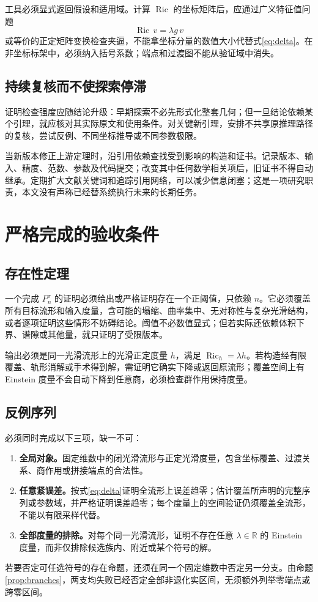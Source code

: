 \documentclass[11pt,a4paper]{article}
\theoremstyle{definition}
\newcommand{\Ric}{\operatorname{Ric}}
\begin{document}
工具必须显式返回假设和适用域。计算 $\Ric$ 的坐标矩阵后，应通过广义特征值问题
\[
\Ric\,v=\lambda g\,v
\]
或等价的正定矩阵变换检查夹逼，不能拿坐标分量的数值大小代替式\eqref{eq:delta}。在非坐标标架中，必须纳入括号系数；端点和过渡图不能从验证域中消失。

\subsection{持续复核而不使探索停滞}

证明检查强度应随结论升级：早期探索不必先形式化整套几何；但一旦结论依赖某个引理，就应核对其实际原文和使用条件。对关键新引理，安排不共享原推理路径的复核，尝试反例、不同坐标推导或不同参数极限。

当新版本修正上游定理时，沿引用依赖查找受到影响的构造和证书。记录版本、输入、精度、范数、参数及代码提交；改变其中任何数学相关项后，旧证书不得自动继承。定期扩大文献关键词和追踪引用网络，可以减少信息闭塞；这是一项研究职责，本文没有声称已经替系统执行未来的长期任务。

\section{严格完成的验收条件}\label{sec:acceptance}

\subsection{存在性定理}

一个完成 $P_n^\sigma$ 的证明必须给出或严格证明存在一个正阈值，只依赖 $n$。它必须覆盖所有目标流形和输入度量，含可能的塌缩、曲率集中、无对称性与复杂光滑结构，或者逐项证明这些情形不妨碍结论。阈值不必数值显式；但若实际还依赖体积下界、谱隙或其他量，就只证明了受限版本。

输出必须是同一光滑流形上的光滑正定度量 $h$，满足 $\Ric_h=\lambda h$。若构造经有限覆盖、轨形消解或手术得到解，需证明它确实下降或返回原流形；覆盖空间上有 Einstein 度量不会自动下降到任意商，必须检查群作用保持度量。

\subsection{反例序列}

必须同时完成以下三项，缺一不可：
\begin{enumerate}
\item \textbf{全局对象。}固定维数中的闭光滑流形与正定光滑度量，包含坐标覆盖、过渡关系、商作用或拼接端点的合法性。
\item \textbf{任意紧误差。}按式\eqref{eq:delta}证明全流形上误差趋零；估计覆盖所声明的完整序列或参数域，并严格证明误差趋零；每个度量上的空间验证仍须覆盖全流形，不能以有限采样代替。
\item \textbf{全部度量的排除。}对每个同一光滑流形，证明不存在任意 $\lambda\in\mathbb R$ 的 Einstein 度量，而非仅排除候选族内、附近或某个符号的解。
\end{enumerate}
若要否定可任选符号的存在命题，还须在同一个固定维数中否定另一分支。由命题\ref{prop:branches}，两支均失败已经否定全部非退化实区间，无须额外列举零端点或跨零区间。
\end{document}

